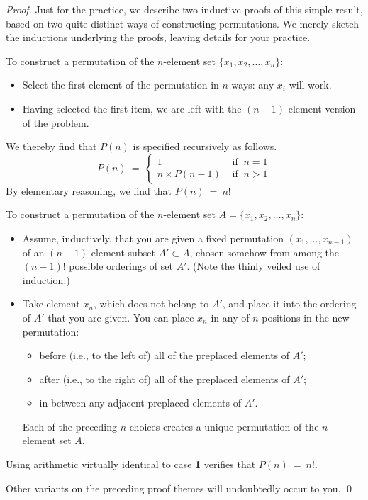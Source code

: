 \begin{proof}
Just for the practice, we describe two inductive proofs of this simple result, based on two
quite-distinct ways of constructing permutations.  We merely
sketch the inductions underlying the proofs, leaving details for your practice.

\medskip

To construct a permutation of the $n$-element set $\{ x_1, x_2, \ldots , x_n\}$:
\begin{itemize}
\item
Select the first element of the permutation in $n$ ways: any $x_i$ will work.
\item
Having selected the first item, we are left with the $(n-1)$-element version of the problem.
\end{itemize}
We thereby find that $P(n)$ is specified recursively as follows.
\[
P(n) \ = \ \left\{
\begin{array}{cl}
1 & \mbox{ if } \ n=1 \\
n \times P(n-1) & \mbox{ if } \ n>1
\end{array}
\right.
\]
By elementary reasoning, we find that $P(n) \ = \ n!$

\bigskip

To construct a permutation of the $n$-element set $A = \{ x_1, x_2, \ldots , x_n\}$:
\begin{itemize}
\item
Assume, inductively, that you are given a fixed 
permutation $(x_1, \ldots , x_{n-1})$ of an $(n-1)$-element subset $A'  \subset A$,
chosen somehow from among the $(n-1)!$ possible orderings of set $A'$.  (Note
the thinly veiled use of induction.)
\item
Take element $x_n$, which does not belong to $A'$, and place it into the ordering of $A'$
that you are given.  You can place $x_n$ in any of $n$ positions in the new permutation:
  \begin{itemize}
  \item
before (i.e., to the left of) all of the preplaced elements of $A'$;
  \item
after (i.e., to the right of) all of the preplaced elements of $A'$;
  \item
in between any adjacent preplaced elements of $A'$.
  \end{itemize}
Each of the preceding $n$ choices creates a unique permutation of the $n$-element set $A$.
\end{itemize}
Using arithmetic virtually identical to case {\bf 1} verifies that $P(n) \ = \ n!$.

\medskip

\noindent
Other variants on the preceding proof themes will undoubtedly occur to you.   \qed
\end{proof}


